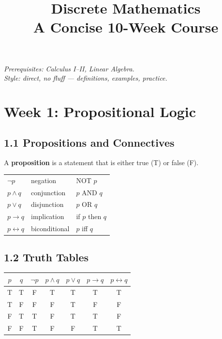 \documentclass[11pt]{article}
\newcommand{\lra}{\leftrightarrow}
\newcommand{\ra}{\rightarrow}
\begin{document}
\title{\textbf{Discrete Mathematics}\\[4pt]
  \large A Concise 10-Week Course}
\author{}
\date{}
\maketitle
\thispagestyle{empty}

\begin{center}
\textit{Prerequisites: Calculus I–II, Linear Algebra.\\
Style: direct, no fluff — definitions, examples, practice.}
\end{center}

\vspace{6pt}
\tableofcontents
\newpage

\section{Week 1: Propositional Logic}
\setcounter{definition}{0}

\subsection*{1.1 Propositions and Connectives}

A \textbf{proposition} is a statement that is either true (T) or false (F).

\begin{tcolorbox}[keybox={Core connectives}]
\begin{tabular}{@{}lll@{}}
$\neg p$ & negation & NOT $p$\\
$p \land q$ & conjunction & $p$ AND $q$\\
$p \lor q$ & disjunction & $p$ OR $q$\\
$p \ra q$ & implication & if $p$ then $q$\\
$p \lra q$ & biconditional & $p$ iff $q$\\
\end{tabular}
\end{tcolorbox}

\subsection*{1.2 Truth Tables}

\begin{center}
\begin{tabular}{cc|ccccc}
\toprule
$p$ & $q$ & $\neg p$ & $p\land q$ & $p\lor q$ & $p\ra q$ & $p\lra q$\\
\midrule
T & T & F & T & T & T & T\\
T & F & F & F & T & F & F\\
F & T & T & F & T & T & F\\
F & F & T & F & F & T & T\\
\bottomrule
\end{tabular}
\end{center}
\end{document}
